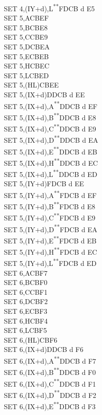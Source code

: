\documentclass[12pt,twoside,openright,a4paper]{book}
\newcommand{\UNDOC}{\textnormal{\textsuperscript{**}}}
\begin{document}
\begin{multicols}{3}
{\begin{tabbing}
		SET 4,(IY+d),L\UNDOC\>FDCB d E5\\
		SET 5,A\>CBEF\\
		SET 5,B\>CBE8\\
		SET 5,C\>CBE9\\
		SET 5,D\>CBEA\\
		SET 5,E\>CBEB\\
		SET 5,H\>CBEC\\
		SET 5,L\>CBED\\
		SET 5,(HL)\>CBEE\\
		SET 5,(IX+d)\>DDCB d EE\\
		SET 5,(IX+d),A\UNDOC\>DDCB d EF\\
		SET 5,(IX+d),B\UNDOC\>DDCB d E8\\
		SET 5,(IX+d),C\UNDOC\>DDCB d E9\\
		SET 5,(IX+d),D\UNDOC\>DDCB d EA\\
		SET 5,(IX+d),E\UNDOC\>DDCB d EB\\
		SET 5,(IX+d),H\UNDOC\>DDCB d EC\\
		SET 5,(IX+d),L\UNDOC\>DDCB d ED\\
		SET 5,(IY+d)\>FDCB d EE\\
		SET 5,(IY+d),A\UNDOC\>FDCB d EF\\
		SET 5,(IY+d),B\UNDOC\>FDCB d E8\\
		SET 5,(IY+d),C\UNDOC\>FDCB d E9\\
		SET 5,(IY+d),D\UNDOC\>FDCB d EA\\
		SET 5,(IY+d),E\UNDOC\>FDCB d EB\\
		SET 5,(IY+d),H\UNDOC\>FDCB d EC\\
		SET 5,(IY+d),L\UNDOC\>FDCB d ED\\
		SET 6,A\>CBF7\\
		SET 6,B\>CBF0\\
		SET 6,C\>CBF1\\
		SET 6,D\>CBF2\\
		SET 6,E\>CBF3\\
		SET 6,H\>CBF4\\
		SET 6,L\>CBF5\\
		SET 6,(HL)\>CBF6\\
		SET 6,(IX+d)\>DDCB d F6\\
		SET 6,(IX+d),A\UNDOC\>DDCB d F7\\
		SET 6,(IX+d),B\UNDOC\>DDCB d F0\\
		SET 6,(IX+d),C\UNDOC\>DDCB d F1\\
		SET 6,(IX+d),D\UNDOC\>DDCB d F2\\
		SET 6,(IX+d),E\UNDOC\>DDCB d F3\\

\end{tabbing}}
\end{multicols}
\end{document}
